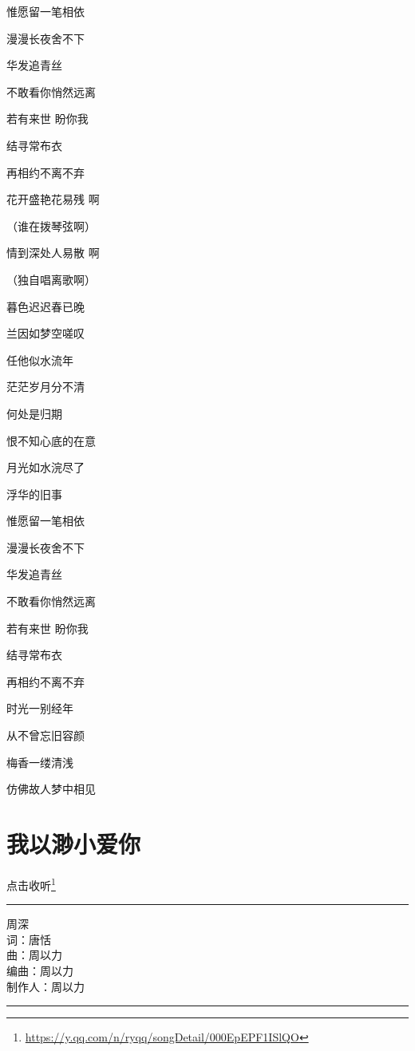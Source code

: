 \documentclass[]{ctexbook}
\renewcommand{\href}[2]{#2\footnote{\url{#1}}}
\begin{document}
惟愿留一笔相依

漫漫长夜舍不下

华发追青丝

不敢看你悄然远离

若有来世 盼你我

结寻常布衣

再相约不离不弃

花开盛艳花易残 啊

（谁在拨琴弦啊）

情到深处人易散 啊

（独自唱离歌啊）

暮色迟迟春已晚

兰因如梦空嗟叹

任他似水流年

茫茫岁月分不清

何处是归期

恨不知心底的在意

月光如水浣尽了

浮华的旧事

惟愿留一笔相依

漫漫长夜舍不下

华发追青丝

不敢看你悄然远离

若有来世 盼你我

结寻常布衣

再相约不离不弃

时光一别经年

从不曾忘旧容颜

梅香一缕清浅

仿佛故人梦中相见

\section*{我以渺小爱你}\label{loving-you-in-my-humble-way}


\href{https://y.qq.com/n/ryqq/songDetail/000EpEPF1ISlQO}{点击收听}

\begin{center}\rule{0.5\linewidth}{0.5pt}\end{center}

周深\\
词：唐恬\\
曲：周以力\\
编曲：周以力\\
制作人：周以力

\begin{center}\rule{0.5\linewidth}{0.5pt}\end{center}
\end{document}
